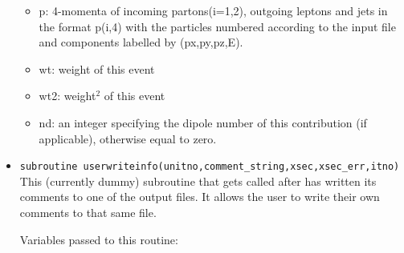 \documentclass[12pt]{article}
\begin{document}
\begin{itemize}
\begin{itemize}
\item        p:  4-momenta of incoming partons(i=1,2), outgoing leptons and                                                             
            jets in the format p(i,4) with the particles numbered                                                                  
            according to the input file and components labelled by                                                                 
            (px,py,pz,E).  
                                                                                                                                   
\item        wt:  weight of this event                                                                                                   
                                                                                                                                   
\item       wt2:  weight$^2$ of this event                                                                                                 
                                                                                                                                   
\item        nd:  an integer specifying the dipole number of this contribution                                                           
            (if applicable), otherwise equal to zero.
\end{itemize}

\item {\tt subroutine userwriteinfo(unitno,comment\_string,xsec,xsec\_err,itno)}
This (currently dummy) subroutine that gets called after \MCFM has written its comments to
one of the output files. It allows the user to write their own comments                                                         
to that same file.
                                                                                                                                   
   Variables passed to this routine:                                                                                               
                                                                                                                                   

\end{itemize}
\end{document}
